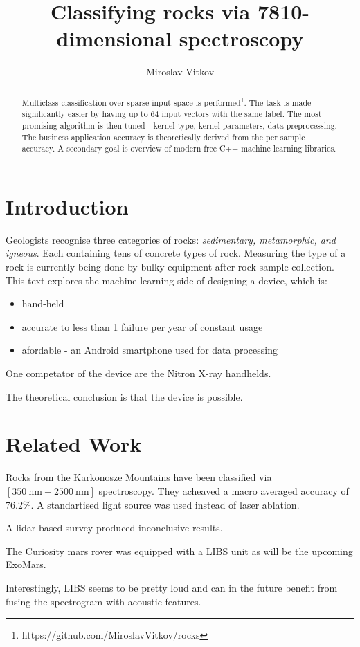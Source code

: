\documentclass{article}
\title{Classifying rocks via 7810-dimensional spectroscopy}
\author{Miroslav Vitkov}
\begin{document}
\maketitle


\begin{abstract}
Multiclass classification over sparse input space is performed\footnote{https://github.com/MiroslavVitkov/rocks}.
The task is made significantly easier by having up to 64 input vectors with the same label.
The most promising algorithm is then tuned - kernel type, kernel parameters, data preprocessing.
The business application accuracy is theoretically derived from the per sample accuracy.
A secondary goal is overview of modern free C++ machine learning libraries.
\end{abstract}


\section{Introduction}
Geologists recognise three categories of rocks: \textit{sedimentary, metamorphic, and igneous}.
Each containing tens of concrete types of rock.
Measuring the type of a rock is currently being done by bulky equipment after rock sample collection.
This text explores the machine learning side of designing a device, which is:
\begin{itemize}
\item{hand-held}
\item{accurate to less than 1 failure per year of constant usage}
\item{afordable - an Android smartphone used for data processing}
\end{itemize}
\par
One competator of the device are the Nitron X-ray handhelds\cite{nitron}.
\\
\par
The theoretical conclusion is that the device is possible.


\section{Related Work}
Rocks from the Karkonosze Mountains have been classified via $[\SI{350}{\nano\metre}-\SI{2500}{\nano\metre}]$ spectroscopy\cite{karkonosze}.
They acheaved a macro averaged accuracy of 76.2\%.
A standartised light source was used instead of laser ablation.
\par
A lidar-based survey\cite{lidar} produced inconclusive results.
\par
The Curiosity mars rover was equipped with a LIBS unit\cite{curiosity} as will be the upcoming ExoMars\cite{exomars}.
\par
Interestingly, LIBS seems to be pretty loud and can in the future benefit from fusing the spectrogram with acoustic features\cite{microphone}.
\end{document}
